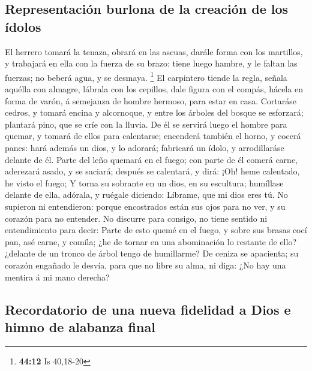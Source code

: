 \hypertarget{representaciuxf3n-burlona-de-la-creaciuxf3n-de-los-uxeddolos}{%
\subsection{Representación burlona de la creación de los
ídolos}\label{representaciuxf3n-burlona-de-la-creaciuxf3n-de-los-uxeddolos}}

 El herrero tomará la tenaza, obrará en las ascuas, darále
forma con los martillos, y trabajará en ella con la fuerza de su brazo:
tiene luego hambre, y le faltan las fuerzas; no beberá agua, y se
desmaya. \footnote{\textbf{44:12} Is 40,18-20}  El
carpintero tiende la regla, señala aquélla con almagre, lábrala con los
cepillos, dale figura con el compás, hácela en forma de varón, á
semejanza de hombre hermoso, para estar en casa.  Cortaráse
cedros, y tomará encina y alcornoque, y entre los árboles del bosque se
esforzará; plantará pino, que se críe con la lluvia.  De él
se servirá luego el hombre para quemar, y tomará de ellos para
calentarse; encenderá también el horno, y cocerá panes: hará además un
dios, y lo adorará; fabricará un ídolo, y arrodillaráse delante de él.
 Parte del leño quemará en el fuego; con parte de él comerá
carne, aderezará asado, y se saciará; después se calentará, y dirá: ¡Oh!
heme calentado, he visto el fuego;  Y torna su sobrante en
un dios, en su escultura; humíllase delante de ella, adórala, y ruégale
diciendo: Líbrame, que mi dios eres tú.  No supieron ni
entendieron: porque encostrados están sus ojos para no ver, y su corazón
para no entender.  No discurre para consigo, no tiene
sentido ni entendimiento para decir: Parte de esto quemé en el fuego, y
sobre sus brasas cocí pan, asé carne, y comíla; ¿he de tornar en una
abominación lo restante de ello? ¿delante de un tronco de árbol tengo de
humillarme?  De ceniza se apacienta; su corazón engañado le
desvía, para que no libre su alma, ni diga: ¿No hay una mentira á mi
mano derecha?

\hypertarget{recordatorio-de-una-nueva-fidelidad-a-dios-e-himno-de-alabanza-final}{%
\subsection{Recordatorio de una nueva fidelidad a Dios e himno de
alabanza
final}\label{recordatorio-de-una-nueva-fidelidad-a-dios-e-himno-de-alabanza-final}}

